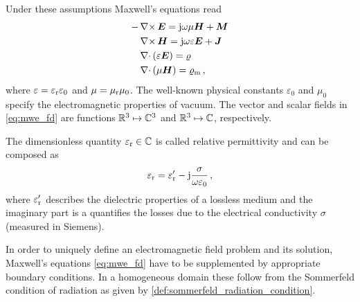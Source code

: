 Under these assumptions Maxwell's equations read \cite{Harrington2001,Chew1999}
\begin{subequations}\label{eq:mwe_fd}
	\begin{align}
		-&\curl \pvec{E}
		= \im\omega\mu\pvec{H} + \pvec{M} \label{eq:mwe_fd_faraday} \\
		&\curl \pvec{H}
		= \im\omega\varepsilon\pvec{E} + \pvec{J} \label{eq:mwe_fd_ampere} \\
		&\divergence \left(\varepsilon\pvec{E}\right)
		= \varrho \label{eq:mwe_fd_gauss} \\
		&\divergence \left(\mu\pvec{H}\right) 
		= \varrho_\mathrm{m} \,, \label{eq:mwe_fd_gauss_magnetic}
	\end{align}
\end{subequations}
where $\varepsilon = \varepsilon_{\mathrm{r}} \varepsilon_0$ and $\mu = \mu_{\mathrm{r}} \mu_0$.
The well-known physical constants $\varepsilon_0$ and $\mu_0$ specify the
electromagnetic properties of vacuum.
The vector and scalar fields in \eqref{eq:mwe_fd} are functions
$\mathbb{R}^3 \mapsto \mathbb{C}^3$ and $\mathbb{R}^3 \mapsto \mathbb{C}$, respectively.

The dimensionless quantity $\varepsilon_{\mathrm{r}} \in \mathbb{C}$ is called relative permittivity 
and can be composed as \cite[43]{Jin2015}
\begin{equation}
	\varepsilon_{\mathrm{r}} = \varepsilon_{\mathrm{r}}^\prime - \mathrm{j} \frac{\sigma}{\omega \varepsilon_0} \,,
\end{equation}
where $\varepsilon_{\mathrm{r}}^\prime$ describes the dielectric properties of a lossless medium
and the imaginary part is a quantifies the losses due to the electrical
conductivity $\sigma$ (measured in Siemens).

In order to uniquely define an electromagnetic field problem and its solution,
Maxwell's equations \eqref{eq:mwe_fd} have to be supplemented by appropriate
boundary conditions.
In a homogeneous domain these follow from the Sommerfeld condition of radiation
as given by \cref{def:sommerfeld_radiation_condition}.

